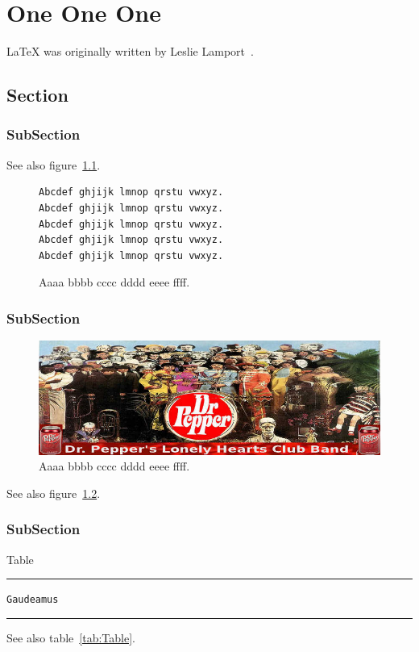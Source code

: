 

\chapter{One One One}
\LaTeX{} was originally written by Leslie Lamport~\cite{manual}.
\gaudeamus
\section{Section}
\lipsum[1]
\subsection{SubSection}
\lipsum[1]
See also figure~\ref{document}.
\begin{figure}[h]
\begin{verbatim}
Abcdef ghjijk lmnop qrstu vwxyz.
Abcdef ghjijk lmnop qrstu vwxyz.
Abcdef ghjijk lmnop qrstu vwxyz.
Abcdef ghjijk lmnop qrstu vwxyz.
Abcdef ghjijk lmnop qrstu vwxyz.
\end{verbatim}
\caption[AAAA BBBB CCCC DDDD.]{Aaaa bbbb cccc dddd eeee ffff.}\label{document}
\end{figure}
\subsection{SubSection}
\lipsum[1]
\begin{figure}[h]
\begin{center}
\vspace*{9pt}
\includegraphics[scale=0.25]{book.jpg}
\vspace*{7pt}
\end{center}
\caption[AAAA BBBB CCCC DDDD.]{Aaaa bbbb cccc dddd eeee ffff.}\label{fig:figure}
\end{figure}
\lipsum[1]
See also figure~\ref{fig:figure}.
\subsection{SubSection}
\lipsum[1]
\begin{table}[h]
\caption{Table} \label{tab:Table}
\hrule
\begin{description}
\item [\normalfont\texttt{Gaudeamus}] \gaudeamus
\end{description}
\hrule
\end{table}
\lipsum[1]
See also table~\ref{tab:Table}.

